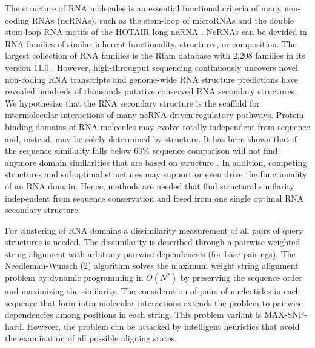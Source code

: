 \documentclass[a4paper,twoside]{article}
\begin{document}
\noindent The structure of RNA molecules is an essential functional criteria of
many non-coding RNAs (ncRNAs), such as the stem-loop of microRNAs and the double
stem-loop RNA motifs of the HOTAIR long ncRNA \cite{Gupta20393566}. NcRNAs can
be devided in RNA families of similar inherent functionality, structures, or
composition. The largest collection of RNA families is the Rfam database with
2,208 families in its version 11.0 \cite{Burge23125362}. However, high-througput
sequencing continuously uncovers novel non-coding RNA transcripts and
genome-wide RNA structure predictions have revealed hundreds of thousands
putative conserved RNA secondary structures. We hypothesize that the RNA
secondary structure is the scaffold for intermolecular interactions of many
ncRNA-driven regulatory pathways. Protein binding domains of RNA molecules may
evolve totally independent from sequence and, instead, may be solely determined
by structure. It has been shown that if the sequence similarity falls below 60\%
sequence comparison will not find anymore domain similarities that are based on
structure \cite{Gardner15860779}. In addition, competing structures and
suboptimal structures may support or even drive the functionality of an RNA
domain. Hence, methods are needed that find structural similarity independent
from sequence conservation and freed from one single optimal RNA secondary
structure.

For clustering of RNA domains a dissimilarity measurement of all pairs of query
structures is needed. The dissimilarity is described through a pairwise weighted
string alignment with arbitrary pairwise dependencies (for base pairings). The
Needleman-Wunsch (2) algorithm solves the maximum weight string alignment
problem by dynamic programming in $O(N^2)$ by preserving the sequence order and
maximizing the similarity. The consideration of pairs of nucleotides in each
sequence that form intra-molecular interactions extends the problem to pairwise
dependencies among positions in each string. This problem variant is
MAX-SNP-hard. However, the problem can be attacked by intelligent heuristics
that avoid the examination of all possible aligning states.
\end{document}
